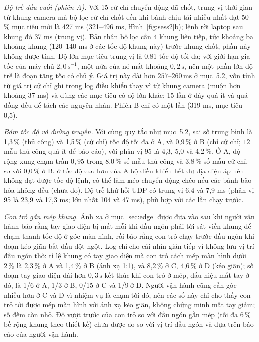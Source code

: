 \documentclass[11pt,a4paper]{article}
\begin{document}
\emph{Độ trễ đầu cuối (phiên A).} Với 15 cử chỉ chuyển động đã chốt, trung vị thời gian từ khung camera mà bộ lọc cử chỉ chốt đến khi bánh chịu tải nhiều nhất đạt 50\,\% mục tiêu mới là 427 ms (321--496 ms, Hình~\ref{fig:sess2}b); lệnh rời laptop sau khung đó 37 ms (trung vị). Bản thân bộ lọc cần $4$ khung liên tiếp, tức khoảng ba khoảng khung ($120$--$140$ ms ở các tốc độ khung này) trước khung chốt, phần này không được tính. Độ lớn mục tiêu trung vị là 0,81 tốc độ tối đa; với giới hạn gia tốc của máy chủ $2{,}0\,\mathrm{s^{-1}}$, một nửa của nó mất khoảng $0{,}2\,\mathrm{s}$, nên một phần lớn độ trễ là đoạn tăng tốc có chủ ý. Giá trị này dài hơn $257$--$260\,\mathrm{ms}$ ở mục~5.2, vốn tính từ giá trị cử chỉ ghi trong log điều khiển thay vì từ khung camera (muộn hơn khoảng 37 ms) và dùng các mục tiêu có độ lớn khác; 15 lần ở đây quá ít và quá đồng đều để tách các nguyên nhân. Phiên B chỉ có một lần (319 ms, mục tiêu 0,5).

\emph{Bám tốc độ và đường truyền.} Với cùng quy tắc như mục~5.2, sai số trung bình là 1,3\,\% (thủ công) và 1,5\,\% (cử chỉ) tốc độ tối đa ở A, và 0,9\,\% ở B (chỉ cử chỉ; $12$ mẫu thủ công quá ít để báo cáo), với phân vị 95 là 4,3, 5,0 và 4,2\,\%. Ở A, độ rộng xung chạm trần $0{,}95$ trong 8,0\,\% số mẫu thủ công và 3,8\,\% số mẫu cử chỉ, so với 0,0\,\% ở B: ở tốc độ cao hơn của A bộ điều khiển hết dư địa điện áp nên không đạt được tốc độ lệnh, có thể làm méo chuyển động chéo nếu các bánh bão hòa không đều (chưa đo). Độ trễ khứ hồi UDP có trung vị 6,4 và 7,9 ms (phân vị 95 là 23,9 và 17,3 ms; lớn nhất 104 và 47 ms), phù hợp với các lần chạy trước.

\emph{Con trỏ gần mép khung.} Ánh xạ ở mục~\ref{sec:edge} được đưa vào sau khi người vận hành báo rằng tay giao diện bị mất mỗi khi đầu ngón phải tới sát viền khung để chạm thanh tốc độ ở góc màn hình, rồi báo rằng con trỏ chạy trước đầu ngón khi đoạn kéo giãn bắt đầu đột ngột. Log chỉ cho cái nhìn gián tiếp vì không lưu vị trí đầu ngón thô: tỉ lệ khung có tay giao diện mà con trỏ cách mép màn hình dưới $2\,\%$ là 2,3\,\% ở A và 1,4\,\% ở B (ánh xạ 1:1), và 8,2\,\% ở C, 4,6\,\% ở D (kéo giãn); số đoạn tay giao diện dài hơn $0{,}3\,\mathrm{s}$ kết thúc khi con trỏ ở mép, dấu hiệu mất tay ở đó, là 1/6 ở A, 1/3 ở B, 0/15 ở C và 1/9 ở D. Người vận hành cũng cần góc nhiều hơn ở C và D vì nhiệm vụ là chạm tới đó, nên các số này chỉ cho thấy con trỏ tới được mép màn hình với ánh xạ kéo giãn, không chứng minh mất tay giảm; số đếm còn nhỏ. Độ vượt trước của con trỏ so với đầu ngón gần mép (tối đa $6\,\%$ bề rộng khung theo thiết kế) chưa được đo so với vị trí đầu ngón và dựa trên báo cáo của người vận hành.
\end{document}
